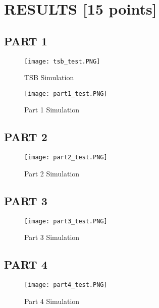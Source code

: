 \documentclass[pdftex,12pt,a4paper]{article}
\begin{document}
\clearpage



\section{RESULTS [15 points]}
\subsection{PART 1}

\begin{figure}[hbt!]
	\centering
	\texttt{[image: tsb\_test.PNG]}	
	\caption{TSB Simulation}
	\label{fig1}
\end{figure}

\begin{figure}[hbt!]
	\centering
	\texttt{[image: part1\_test.PNG]}	
	\caption{Part 1 Simulation}
	\label{fig1}
\end{figure}




\subsection{PART 2}
\begin{figure}[hbt!]
	\centering
	\texttt{[image: part2\_test.PNG]}	
	\caption{Part 2 Simulation}
	\label{fig1}
\end{figure}






\subsection{PART 3}
\begin{figure}[hbt!]
	\centering
	\texttt{[image: part3\_test.PNG]}	
	\caption{Part 3 Simulation}
	\label{fig1}
\end{figure}
\clearpage



\subsection{PART 4}

\begin{figure}[hbt!]
	\centering
	\texttt{[image: part4\_test.PNG]}	
	\caption{Part 4 Simulation}
	\label{fig1}
\end{figure}
\end{document}
